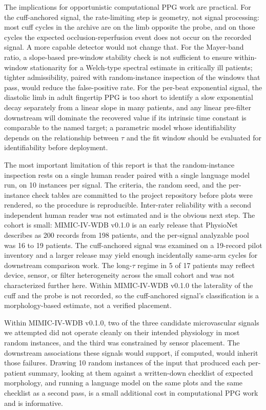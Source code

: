 \documentclass[twocolumn,letterpaper,10pt]{article}
\begin{document}
The implications for opportunistic computational PPG work are practical. For the cuff-anchored signal, the rate-limiting step is geometry, not signal processing: most cuff cycles in the archive are on the limb opposite the probe, and on those cycles the expected occlusion-reperfusion event does not occur on the recorded signal. A more capable detector would not change that. For the Mayer-band ratio, a slope-based pre-window stability check is not sufficient to ensure within-window stationarity for a Welch-type spectral estimate in critically ill patients; tighter admissibility, paired with random-instance inspection of the windows that pass, would reduce the false-positive rate. For the per-beat exponential signal, the diastolic limb in adult fingertip PPG is too short to identify a slow exponential decay separately from a linear slope in many patients, and any linear pre-filter downstream will dominate the recovered value if its intrinsic time constant is comparable to the named target; a parametric model whose identifiability depends on the relationship between $\tau$ and the fit window should be evaluated for identifiability before deployment.

The most important limitation of this report is that the random-instance inspection rests on a single human reader paired with a single language model run, on 10 instances per signal. The criteria, the random seed, and the per-instance check tables are committed to the project repository before plots were rendered, so the procedure is reproducible. Inter-rater reliability with a second independent human reader was not estimated and is the obvious next step. The cohort is small: MIMIC-IV-WDB v0.1.0 is an early release that PhysioNet describes as 200 records from 198 patients, and the per-signal analyzable pool was 16 to 19 patients. The cuff-anchored signal was examined on a 19-record pilot inventory and a larger release may yield enough incidentally same-arm cycles for downstream comparison work. The long-$\tau$ regime in 5 of 17 patients may reflect device, sensor, or filter heterogeneity across the small cohort and was not characterized further here. Within MIMIC-IV-WDB v0.1.0 the laterality of the cuff and the probe is not recorded, so the cuff-anchored signal's classification is a morphology-based estimate, not a verified placement.

Within MIMIC-IV-WDB v0.1.0, two of the three candidate microvascular signals we attempted did not operate cleanly on their intended physiology in most random instances, and the third was constrained by sensor placement. The downstream associations these signals would support, if computed, would inherit those failures. Drawing 10 random instances of the input that produced each per-patient summary, looking at them against a written-down checklist of expected morphology, and running a language model on the same plots and the same checklist as a second pass, is a small additional cost in computational PPG work and is informative.
\end{document}
